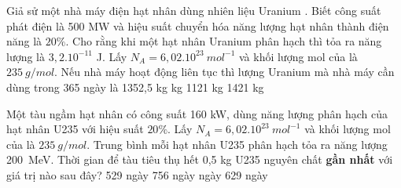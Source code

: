 \begin{vidu}%
  Giả sử một nhà máy điện hạt nhân dùng nhiên liệu Uranium . Biết công suất phát điện là 500 MW và hiệu suất chuyển hóa năng lượng hạt nhân thành điện năng là $20\%$. Cho rằng khi một hạt nhân Uranium  phân hạch thì tỏa ra năng lượng là $3,{2.10}^{- 11}$ J. Lấy $N_A=6,{02.10}^{23}\ mol^{- 1}$ và khối lượng mol của  là $235\ g/mol$. Nếu nhà máy hoạt động liên tục thì lượng Uranium  mà nhà máy cần dùng trong 365 ngày là
\choice
{1352,5 kg}
{ kg}
{1121 kg}
{1421 kg}	
\end{vidu}
\begin{vidu}%
Một tàu ngầm hạt nhân có công suất 160 kW, dùng năng lượng phân hạch của hạt nhân U235 với hiệu suất $20\%$.  Lấy $N_A=6,{02.10}^{23}\ mol^{- 1}$ và khối lượng mol của  là $235\ g/mol$. Trung bình mỗi hạt nhân U235 phân hạch tỏa ra năng lượng 200\ MeV. Thời gian để tàu tiêu thụ hết 0,5 kg U235 nguyên chất \textbf{gần nhất} với giá trị nào sau đây?	
\choice
{529 ngày}
{756 ngày}
{ ngày}
{629 ngày}	
\end{vidu}
